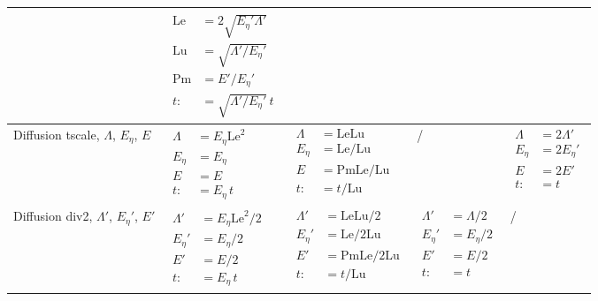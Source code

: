 \begin{table}[htbp]
\begin{tabular}[c]{p{2.5cm}|p{2.5cm}|p{2.5cm}|p{2.5cm}|p{2.5cm}}
    & $\begin{aligned}
        \mathrm{Le} &= 2\sqrt{E_\eta' \Lambda'} \\ 
        \mathrm{Lu} &= \sqrt{\Lambda' / E_\eta'} \\ 
        \mathrm{Pm} &= E'/E_\eta' \\
        t :&= \sqrt{\Lambda' / E_\eta'} \, t
    \end{aligned}$ \\
    \hline
    Diffusion tscale, $\Lambda$, $E_\eta$, $E$ 
    & $\begin{aligned}
        \Lambda &= E_\eta \mathrm{Le}^2 \\ 
        E_\eta &= E_\eta \\ 
        E &= E \\
        t :&= E_\eta \, t
    \end{aligned}$ 
    & $\begin{aligned}
        \Lambda &= \mathrm{Le} \mathrm{Lu} \\ 
        E_\eta &= \mathrm{Le} / \mathrm{Lu} \\ 
        E &= \mathrm{Pm} \mathrm{Le} / \mathrm{Lu} \\
        t :&= t/\mathrm{Lu}
    \end{aligned}$ & / 
    & $\begin{aligned}
        \Lambda &= 2\Lambda' \\ 
        E_\eta &= 2E_\eta' \\
        E &= 2E' \\
        t :&= t
    \end{aligned}$ \\
    \hline
    Diffusion div2, $\Lambda'$, $E_\eta'$, $E'$ 
    & $\begin{aligned}
        \Lambda' &= E_\eta \mathrm{Le}^2/2 \\ 
        E_\eta' &= E_\eta/2 \\ 
        E' &= E/2 \\
        t :&= E_\eta \, t
    \end{aligned}$ 
    & $\begin{aligned}
        \Lambda' &= \mathrm{Le} \mathrm{Lu}/2 \\ 
        E_\eta' &= \mathrm{Le} / 2\mathrm{Lu} \\ 
        E' &= \mathrm{Pm} \mathrm{Le} / 2\mathrm{Lu} \\
        t :&= t/\mathrm{Lu}
    \end{aligned}$ 
    & $\begin{aligned}
        \Lambda' &= \Lambda/2 \\ 
        E_\eta' &= E_\eta/2 \\
        E' &= E/2 \\
        t :&= t
    \end{aligned}$ & / \\
    \bottomrule
\end{tabular}
\end{table}


